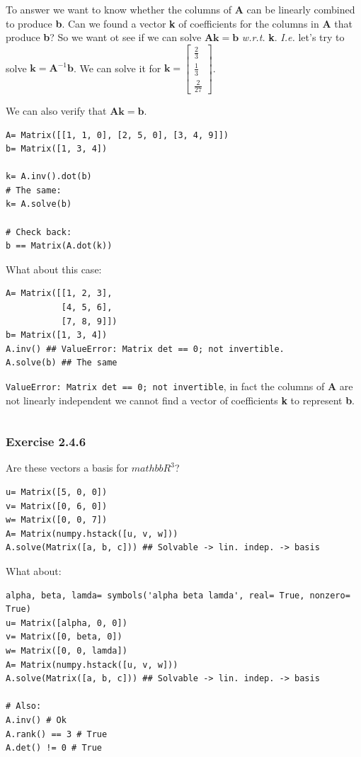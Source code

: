 To answer we want to know whether the columns of \textbf{A} can be linearly combined
to produce \textbf{b}. Can we found a vector \textbf{k} of coefficients for the
columns in \textbf{A} that produce \textbf{b}?
So we want ot see if we can solve $\mathbf{Ak} = \mathbf{b}$ \emph{w.r.t.} \textbf{k}.
\emph{I.e.} let's try to solve $\mathbf{k}= \mathbf{A}^{-1}\mathbf{b}$. We can solve it
for $\mathbf{k} = \left[\begin{matrix}\frac{2}{3}\\\frac{1}{3}\\\frac{2}{27}\end{matrix}\right]$.

We can also verify that $\mathbf{Ak} = \mathbf{b}$.

\begin{verbatim}
A= Matrix([[1, 1, 0], [2, 5, 0], [3, 4, 9]])
b= Matrix([1, 3, 4])

k= A.inv().dot(b)
# The same:
k= A.solve(b)

# Check back:
b == Matrix(A.dot(k))
\end{verbatim}

What about this case:

\begin{verbatim}
A= Matrix([[1, 2, 3],
           [4, 5, 6],
           [7, 8, 9]])
b= Matrix([1, 3, 4])
A.inv() ## ValueError: Matrix det == 0; not invertible.
A.solve(b) ## The same
\end{verbatim}

\texttt{ValueError: Matrix det == 0; not invertible}, in fact the columns of \textbf{A}
are not linearly independent we cannot find a vector of coefficients \textbf{k} 
to represent \textbf{b}.

\begin{verbatim}
\end{verbatim}

\subsubsection{Exercise 2.4.6}

Are these vectors a basis for $mathbb{R}^3$?

\begin{verbatim}
u= Matrix([5, 0, 0])
v= Matrix([0, 6, 0])
w= Matrix([0, 0, 7])
A= Matrix(numpy.hstack([u, v, w]))
A.solve(Matrix([a, b, c])) ## Solvable -> lin. indep. -> basis
\end{verbatim}

What about:

\begin{verbatim}
alpha, beta, lamda= symbols('alpha beta lamda', real= True, nonzero= True)
u= Matrix([alpha, 0, 0])
v= Matrix([0, beta, 0])
w= Matrix([0, 0, lamda])
A= Matrix(numpy.hstack([u, v, w]))
A.solve(Matrix([a, b, c])) ## Solvable -> lin. indep. -> basis

# Also:
A.inv() # Ok
A.rank() == 3 # True
A.det() != 0 # True
\end{verbatim}
